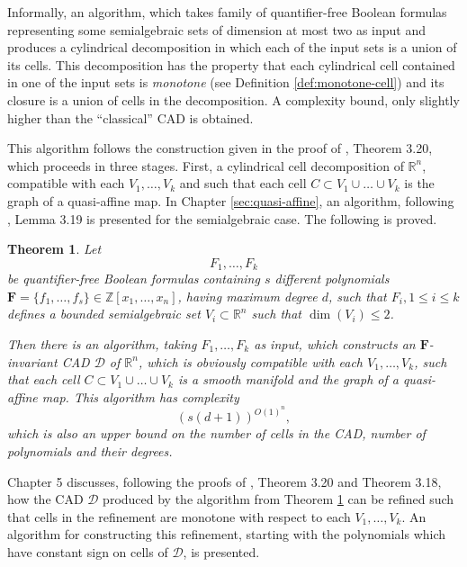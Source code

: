 \documentclass[
]{book}
\newtheorem{theorem}{Theorem}[chapter]
\theoremstyle{definition}
\theoremstyle{definition}
\theoremstyle{definition}
\theoremstyle{definition}
\theoremstyle{remark}
\begin{document}
Informally, an algorithm, which takes family of quantifier-free Boolean formulas representing some semialgebraic sets of dimension at most two as input and produces a cylindrical decomposition in which each of the input sets is a union of its cells.
This decomposition has the property that each cylindrical cell contained in one of the input sets is \emph{monotone} (see Definition \ref{def:monotone-cell}) and its closure is a union of cells in the decomposition. A complexity bound, only slightly higher than the ``classical'' CAD is obtained.

This algorithm follows the construction given in the proof of \citet{bgv15}, Theorem 3.20, which proceeds in three stages.
First, a cylindrical cell decomposition of \(\mathbb{R}^n\), compatible with each \(V_1,\ldots,V_k\) and such that each cell \(C \subset V_1\cup\ldots\cup V_k\) is the graph of a quasi-affine map. In Chapter \ref{sec:quasi-affine}, an algorithm, following \citet{bgv15}, Lemma 3.19 is presented for the semialgebraic case. The following is proved.

\begin{theorem}
\protect\hypertarget{thm:bgv-quasi-algorithm}{}\label{thm:bgv-quasi-algorithm}Let
\[
F_1,\ldots,F_k
\]
be quantifier-free Boolean formulas containing \(s\) different polynomials \(\mathbf{F} = \{ f_1,\ldots, f_s \} \in \mathbb{Z}[x_1,\ldots,x_n]\), having maximum degree \(d\), such that \(F_i, 1\le i \le k\) defines a bounded semialgebraic set \(V_i \subset \mathbb{R}^n\) such that \(\dim(V_i) \le 2\).

Then there is an algorithm, taking \(F_1,\ldots,F_k\) as input, which constructs an \(\mathbf{F}\)-invariant CAD \(\mathcal{D}\) of \(\mathbb{R}^n\), which is obviously compatible with each \(V_1,\ldots,V_k\), such that each cell \(C \subset V_1\cup \ldots\cup V_k\) is a smooth manifold and the graph of a quasi-affine map.
This algorithm has complexity
\[
\left(s\left(d+1\right)\right)^{O(1)^n},
\]
which is also an upper bound on the number of cells in the CAD, number of polynomials and their degrees.
\end{theorem}

Chapter 5 discusses, following the proofs of \citet{bgv15}, Theorem 3.20 and Theorem 3.18, how the CAD \(\mathcal{D}\) produced by the algorithm from Theorem \ref{thm:bgv-quasi-algorithm} can be refined such that cells in the refinement are monotone with respect to each \(V_1,\ldots,V_k\). An algorithm for constructing this refinement, starting with the polynomials which have constant sign on cells of \(\mathcal{D}\), is presented.
\end{document}
